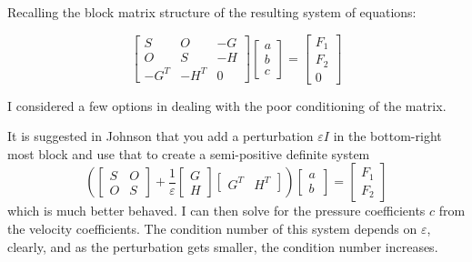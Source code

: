 \documentclass[12pt]{article}
\begin{document}
                Recalling the block matrix structure of the resulting system
                of equations:

            \begin{equation}
                \begin{bmatrix}
                    S & O & -G\\
                    O & S & -H \\
                    -G^T & -H^T & 0
                \end{bmatrix}
                \begin{bmatrix}
                    a \\ b \\ c
                \end{bmatrix} =
                \begin{bmatrix}
                    F_1 \\
                    F_2 \\
                    0
                \end{bmatrix}
            \end{equation}

            I considered a few options in dealing with the poor conditioning of
            the matrix.

            It is suggested in Johnson\cite{j} that you add a perturbation $\varepsilon I$
            in the bottom-right most block and use that to create a
            semi-positive definite system
            \begin{equation}
                \left(\begin{bmatrix}
                    S & O \\
                    O & S
                \end{bmatrix} + \frac{1}{\varepsilon} 
                \begin{bmatrix}
                    G \\
                    H
                \end{bmatrix}
                \begin{bmatrix}
                    G^T & H^T
                \end{bmatrix}\right)
                \begin{bmatrix}
                    a \\
                    b\
                \end{bmatrix} =\begin{bmatrix}
                    F_1 \\
                    F_2
                \end{bmatrix}
            \end{equation}
            which is much better behaved. I can then solve for the pressure
            coefficients $c$ from the velocity coefficients. The condition
            number of this system depends on $\varepsilon$, clearly, and as the
            perturbation gets smaller, the condition number increases.
\end{document}
